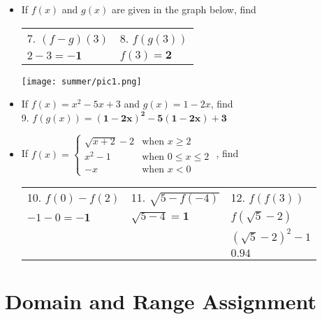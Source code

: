 \documentclass[a4paper]{article}
\begin{document}
\begin{itemize}
   \item
      If $ f(x) $ and $ g(x) $ are given in the graph below, find

      \begin{tabular}{ p{6cm} p{6cm} }
         7. $ (f-g)(3)     $&
         8. $ f(g(3))      $
      \\
         $ 2-3 = \bm{-1}   $&
         $ f(3) = \bm{2}   $
      \end{tabular}

    \texttt{[image: summer/pic1.png]}
\\

   \item
      If $ f(x) = x^2 - 5x + 3 $ and $ g(x)=1-2x $, find \\

      9. $ f(g(x)) = \bm{ (1-2x)^2 - 5(1-2x) + 3 } $
   
   \item
      If $
      f(x) =
      \begin{cases}
         \sqrt{x+2}-2 & \text{when } x \geq 2 \\
         x^2-1        & \text{when } 0 \leq x \leq 2 \\
         -x           & \text{when } x < 0
      \end{cases} $
      , find

      \begin{tabular}{ p{5cm} p{5cm} p{5cm} }
         10. $ f(0) - f(2)          $&
         11. $ \sqrt{ 5 - f(-4) }   $&
         12. $ f(f(3))              $
      \\
         $ -1 - 0 = \bm{-1}         $&
         $ \sqrt{ 5-4 } = \bm{1}    $&
         $ f( \sqrt{5} - 2 )        $
      \\
                                     &
                                     &
         $ ( \sqrt{5} - 2 )^2 - 1   $
      \\
                                     &
                                     &
         $ \bm{0.94}                $
      \end{tabular}

   \end{itemize}

   \section{Domain and Range Assignment}
   
\end{document}
